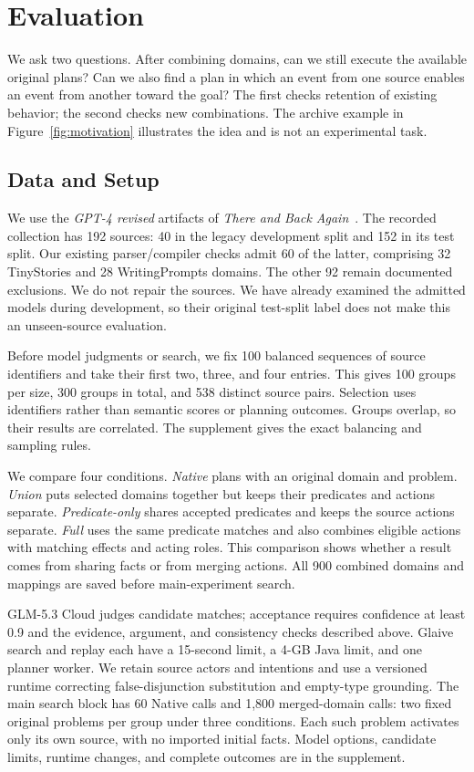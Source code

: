 \section{Evaluation}
We ask two questions. After combining domains, can we still execute the available original plans? Can we also find a plan in which an event from one source enables an event from another toward the goal? The first checks retention of existing behavior; the second checks new combinations. The archive example in Figure~\ref{fig:motivation} illustrates the idea and is not an experimental task.

\subsection{Data and Setup}
We use the \emph{GPT-4 revised} artifacts of \emph{There and Back Again}~\cite{kelly2023there}. The recorded collection has 192 sources: 40 in the legacy development split and 152 in its test split. Our existing parser/compiler checks admit 60 of the latter, comprising 32 TinyStories and 28 WritingPrompts domains. The other 92 remain documented exclusions. We do not repair the sources. We have already examined the admitted models during development, so their original test-split label does not make this an unseen-source evaluation.

Before model judgments or search, we fix 100 balanced sequences of source identifiers and take their first two, three, and four entries. This gives 100 groups per size, 300 groups in total, and 538 distinct source pairs. Selection uses identifiers rather than semantic scores or planning outcomes. Groups overlap, so their results are correlated. The supplement gives the exact balancing and sampling rules.

We compare four conditions. \emph{Native} plans with an original domain and problem. \emph{Union} puts selected domains together but keeps their predicates and actions separate. \emph{Predicate-only} shares accepted predicates and keeps the source actions separate. \emph{Full} uses the same predicate matches and also combines eligible actions with matching effects and acting roles. This comparison shows whether a result comes from sharing facts or from merging actions. All 900 combined domains and mappings are saved before main-experiment search.

GLM-5.3 Cloud judges candidate matches; acceptance requires confidence at least 0.9 and the evidence, argument, and consistency checks described above. Glaive search and replay each have a 15-second limit, a 4-GB Java limit, and one planner worker. We retain source actors and intentions and use a versioned runtime correcting false-disjunction substitution and empty-type grounding. The main search block has 60 Native calls and 1,800 merged-domain calls: two fixed original problems per group under three conditions. Each such problem activates only its own source, with no imported initial facts. Model options, candidate limits, runtime changes, and complete outcomes are in the supplement.

